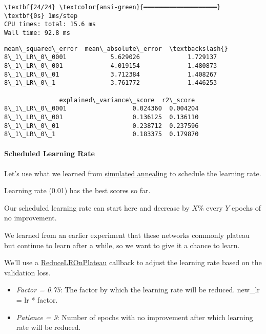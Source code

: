 \documentclass[11pt]{article}
\makeatletter
\providecommand{\tightlist}{%
      \setlength{\itemsep}{0pt}\setlength{\parskip}{0pt}}
\newcommand{\boxspacing}{\kern\kvtcb@left@rule\kern\kvtcb@boxsep}
\newcommand{\prompt}[4]{
        {\ttfamily\llap{{\color{#2}[#3]:\hspace{3pt}#4}}\vspace{-\baselineskip}}
    }
\makeatother
\begin{document}
    \begin{Verbatim}[commandchars=\\\{\}]
\textbf{24/24} \textcolor{ansi-green}{━━━━━━━━━━━━━━━━━━━━} \textbf{0s} 1ms/step
CPU times: total: 15.6 ms
Wall time: 92.8 ms
    \end{Verbatim}

            \begin{tcolorbox}[breakable, size=fbox, boxrule=.5pt, pad at break*=1mm, opacityfill=0]
\prompt{Out}{outcolor}{86}{\boxspacing}
\begin{Verbatim}[commandchars=\\\{\}]
               mean\_squared\_error  mean\_absolute\_error  \textbackslash{}
8\_1\_LR\_0\_0001            5.629026             1.729137
8\_1\_LR\_0\_001             4.019154             1.480873
8\_1\_LR\_0\_01              3.712384             1.408267
8\_1\_LR\_0\_1               3.761772             1.446253

               explained\_variance\_score  r2\_score
8\_1\_LR\_0\_0001                  0.024360  0.004204
8\_1\_LR\_0\_001                   0.136125  0.136110
8\_1\_LR\_0\_01                    0.238712  0.237596
8\_1\_LR\_0\_1                     0.183375  0.179870
\end{Verbatim}
\end{tcolorbox}
        
    \paragraph{Scheduled Learning Rate}\label{scheduled-learning-rate}

Let's use what we learned from
\href{https://github.com/ahester57/ai_workshop/blob/master/docs/ANNEAL.md}{simulated
annealing} to schedule the learning rate.

Learning rate (0.01) has the best scores so far.

Our scheduled learning rate can start here and decrease by \(X\)\% every
\(Y\) epochs of no improvement.

We learned from an earlier experiment that these networks commonly
plateau but continue to learn after a while, so we want to give it a
chance to learn.

We'll use a
\href{https://keras.io/api/callbacks/reduce_lr_on_plateau/}{ReduceLROnPlateau}
callback to adjust the learning rate based on the validation loss.

\begin{itemize}
\tightlist
\item
  \emph{Factor = 0.75}: The factor by which the learning rate will be
  reduced. new\_lr = lr * factor.
\item
  \emph{Patience = 9}: Number of epochs with no improvement after which
  learning rate will be reduced.
\end{itemize}
\end{document}
